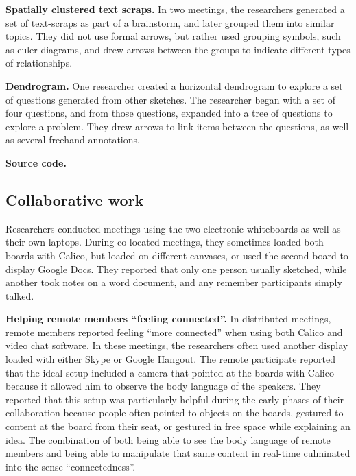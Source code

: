
\textbf{Spatially clustered text scraps. } In two meetings, the researchers generated a set of text-scraps as part of a brainstorm, and later grouped them into similar topics. They did not use formal arrows, but rather used grouping symbols, such as euler diagrams, and drew arrows between the groups to indicate different types of relationships. 

\textbf{Dendrogram. } One researcher created a horizontal dendrogram to explore a set of questions generated from other sketches. The researcher began with a set of four questions, and from those questions, expanded into a tree of questions to explore a problem. They drew arrows to link items between the questions, as well as several freehand annotations.

\textbf{Source code. }

\subsection{Collaborative work}

Researchers conducted meetings using the two electronic whiteboards as well as their own laptops. During co-located meetings, they sometimes loaded both boards with Calico, but loaded on different canvases, or used the second board to display Google Docs. They reported that only one person usually sketched, while another took notes on a word document, and any remember participants simply talked. 


\textbf{Helping remote members ``feeling connected''.} In distributed meetings, remote members reported feeling ``more connected'' when using both Calico and video chat software. In these meetings, the researchers often used another display loaded with either Skype or Google Hangout. The remote participate reported that the ideal setup included a camera that pointed at the boards with Calico because it allowed him to observe the body language of the speakers. They reported that this setup was particularly helpful during the early phases of their collaboration because people often pointed to objects on the boards, gestured to content at the board from their seat, or gestured in free space while explaining an idea. The combination of both being able to see the body language of remote members and being able to manipulate that same content in real-time culminated into the sense ``connectedness''.

